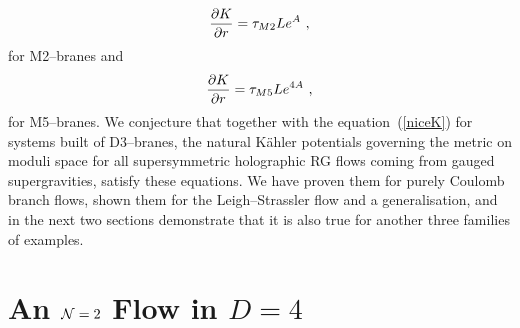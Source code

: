 \documentclass[a4paper,12pt]{article}
\newcommand{\labell}[1]{\label{#1}}
\newcommand{\reef}[1]{(\ref{#1})}
\begin{document}
\begin{equation}
 { \partial K \over \partial r} = \tau_{M2} L e^A\ ,
\labell{LPtwo}
\end{equation}
for M2--branes and
\begin{equation}
 { \partial K \over \partial r} = \tau_{M5} L e^{4A}\ ,
\labell{LPthree} 
\end{equation}
for M5--branes. We conjecture that together with the
equation~\reef{niceK} for systems built of D3--branes, the natural
K\"ahler potentials governing the metric on moduli space for all
supersymmetric holographic RG flows coming from gauged supergravities,
satisfy these equations. We have proven them for purely Coulomb branch
flows, shown them for the Leigh--Strassler flow and a generalisation,
and in the next two sections demonstrate that it is also true for
another three families of examples.

\section{An ${\cal N}=2$ Flow in $D=4$}
\end{document}
